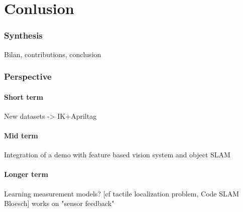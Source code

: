 \part{Conlusion}

\section{Synthesis}
Bilan, contributions, conclusion

\section{Perspective}
\subsection{Short term}
New datasets -> IK+Apriltag

\subsection{Mid term}
Integration of a demo with feature based vision system and object SLAM

\subsection{Longer term}
Learning measurement models? [cf tactile localization problem, Code SLAM Bloesch]
works on "sensor feedback"

